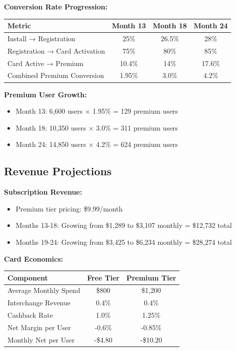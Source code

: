 \documentclass[11pt,letterpaper]{article}
\begin{document}
\textbf{Conversion Rate Progression:}
\begin{table}[h]
\centering
\begin{tabular}{|l|c|c|c|}
\hline
\textbf{Metric} & \textbf{Month 13} & \textbf{Month 18} & \textbf{Month 24} \\
\hline
Install → Registration & 25\% & 26.5\% & 28\% \\
Registration → Card Activation & 75\% & 80\% & 85\% \\
Card Active → Premium & 10.4\% & 14\% & 17.6\% \\
Combined Premium Conversion & 1.95\% & 3.0\% & 4.2\% \\
\hline
\end{tabular}
\end{table}

\textbf{Premium User Growth:}
\begin{itemize}
\item Month 13: 6,600 users × 1.95\% = 129 premium users
\item Month 18: 10,350 users × 3.0\% = 311 premium users
\item Month 24: 14,850 users × 4.2\% = 624 premium users
\end{itemize}

\subsection{Revenue Projections}

\textbf{Subscription Revenue:}
\begin{itemize}
\item Premium tier pricing: \$9.99/month
\item Months 13-18: Growing from \$1,289 to \$3,107 monthly = \$12,732 total
\item Months 19-24: Growing from \$3,425 to \$6,234 monthly = \$28,274 total
\end{itemize}

\textbf{Card Economics:}
\begin{table}[h]
\centering
\begin{tabular}{|l|c|c|}
\hline
\textbf{Component} & \textbf{Free Tier} & \textbf{Premium Tier} \\
\hline
Average Monthly Spend & \$800 & \$1,200 \\
Interchange Revenue & 0.4\% & 0.4\% \\
Cashback Rate & 1.0\% & 1.25\% \\
Net Margin per User & -0.6\% & -0.85\% \\
Monthly Net per User & -\$4.80 & -\$10.20 \\
\hline
\end{tabular}
\end{table}
\end{document}
